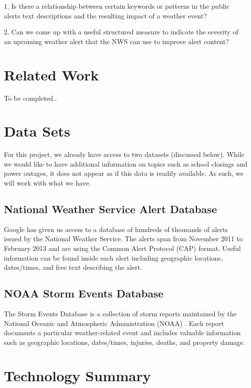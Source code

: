 \documentclass{article}
\begin{document}
1.	Is there a relationship between certain keywords or patterns in the public alerts text descriptions and the resulting impact of a weather event?

2.	Can we come up with a useful structured measure to indicate the severity of an upcoming weather alert that the NWS can use to improve alert content?

\section{Related Work}
\label{related}

To be completed..

\section{Data Sets}
\label{datasets}

For this project, we already have access to two datasets (discussed below). While we would like to have additional information on topics such as school closings and power outages, it does not appear as if this data is readily available. As such, we will work with what we have.

\subsection{National Weather Service Alert Database}
Google has given us access to a database of hundreds of thousands of alerts issued by the National Weather Service. The alerts span from November 2011 to February 2013 and are using the Common Alert Protocol (CAP) format. Useful information can be found inside each alert including geographic locations, dates/times, and free text describing the alert.

\subsection{NOAA Storm Events Database}

The Storm Events Database is a collection of storm reports maintained by the National Oceanic and Atmospheric Administration (NOAA) \cite{stormevents}. Each report documents a particular weather-related event and includes valuable information such as geographic locations, dates/times, injuries, deaths, and property damage.

\section{Technology Summary}
\label{technologysummary}
\end{document}
